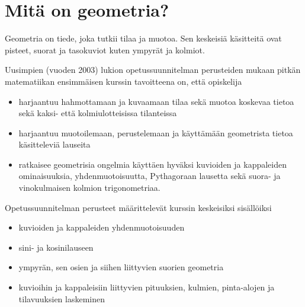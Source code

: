 \section*{Mitä on geometria?}

Geometria on tiede, joka tutkii tilaa ja muotoa. Sen keskeisiä käsitteitä ovat pisteet, suorat ja tasokuviot kuten ympyrät ja kolmiot. 



Uusimpien (vuoden 2003) lukion opetussuunnitelman perusteiden mukaan pitkän matematiikan ensimmäisen kurssin tavoitteena on, että opiskelija
\begin{itemize}
\item harjaantuu hahmottamaan ja kuvaamaan tilaa sekä muotoa koskevaa tietoa sekä kaksi- että kolmiulotteisissa tilanteissa
\item harjaantuu muotoilemaan, perustelemaan ja käyttämään geometrista tietoa käsitteleviä lauseita
\item ratkaisee geometrisia ongelmia käyttäen hyväksi kuvioiden ja kappaleiden ominaisuuksia, yhdenmuotoisuutta, Pythagoraan lausetta sekä suora- ja vinokulmaisen kolmion trigonometriaa.
\end{itemize}

Opetussuunnitelman perusteet määrittelevät kurssin keskeisiksi sisällöiksi
\begin{itemize}
\item kuvioiden ja kappaleiden yhdenmuotoisuuden
\item sini- ja kosinilauseen
\item ympyrän, sen osien ja siihen liittyvien suorien geometria
\item kuvioihin ja kappaleisiin liittyvien pituuksien, kulmien, pinta-alojen ja tilavuuksien laskeminen
\end{itemize}
